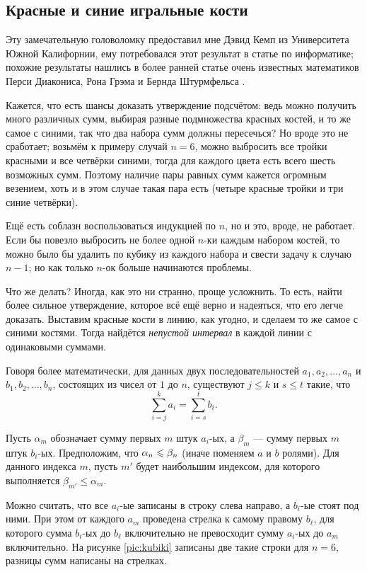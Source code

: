 \subsection*{Красные и синие игральные кости}

Эту замечательную головоломку предоставил мне Дэвид Кемп из Университета Южной Калифорнии, ему потребовался этот результат в статье по информатике;
похожие результаты нашлись в более ранней статье очень известных математиков Перси Диакониса, Рона Грэма и Бернда Штурмфельса \cite{diaconis-graham-sturmfels}.

Кажется, что есть шансы доказать утверждение подсчётом: ведь можно получить много различных сумм, выбирая разные подмножества красных костей, и то же самое с синими, так что два набора сумм должны пересечься?
Но вроде это не сработает;
возьмём к примеру случай $n = 6$,  можно выбросить все тройки красными и все четвёрки синими, тогда для каждого цвета есть всего шесть возможных сумм.
Поэтому наличие пары равных сумм кажется огромным везением,
хоть и в этом случае такая пара есть (четыре красные тройки и три синие четвёрки).

Ещё есть соблазн воспользоваться индукцией по $n$, но и это, вроде, не работает.
Если бы повезло выбросить не более одной $n$-ки каждым набором костей,
то можно было бы удалить по кубику из каждого набора и свести задачу к случаю $n-1$;
но как только $n$-ок больше начинаются проблемы.

Что же делать?
Иногда, как это ни странно, проще усложнить.
То есть, найти более сильное утверждение, которое всё ещё верно и надеяться, что его легче доказать.
Выставим красные кости в линию, как угодно, и сделаем то же самое с синими костями.
Тогда найдётся \emph{непустой интервал} в каждой линии с одинаковыми суммами.

Говоря более математически, для данных двух последовательностей  $a_1,a_2,\dots,a_n$ и $b_1,b_2,\dots,b_n$, состоящих из чисел от $1$ до $n$, существуют 
$j\le k$ и 
$s\le t$ такие, что 
\[\sum_{i=j}^ka_i=\sum_{i=s}^tb_i.\]

Пусть $\alpha_m$ обозначает сумму первых $m$ штук $a_i$-ых,
а $\beta_m$ --- сумму первых $m$ штук $b_i$-ых.
Предположим, что $\alpha_n\z\le \beta_n$ (иначе поменяем $a$ и $b$ ролями).
Для данного индекса $m$, пусть $m'$ будет наибольшим индексом, для которого выполняется $\beta_{m'}\le \alpha_m$.

Можно считать, что все $a_i$-ые записаны в строку слева направо, а $b_i$-ые стоят под ними.
При этом от каждого $a_m$ проведена стрелка к самому правому $b_\ell$, для которого сумма $b_i$-ых до $b_\ell$ включительно не превосходит сумму $a_i$-ых до $a_m$ включительно.
На рисунке \ref{pic:kubiki} записаны две такие строки для $n=6$,
разницы сумм написаны на стрелках.


